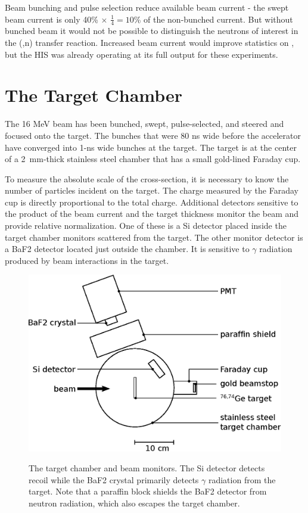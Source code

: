 Beam bunching and pulse selection reduce available beam current - the swept beam current is only 40\% $\times$ $\frac{1}{4} = 10$\% of the non-bunched current.  But without bunched beam it would not be possible to distinguish the neutrons of interest in the (,n) transfer reaction.  Increased beam current would improve statistics on \reaction, but the HIS was already operating at its full output for these experiments.

\section{The Target Chamber}

The 16 MeV  beam has been bunched, swept, pulse-selected, and steered and focused onto the target.  The bunches that were 80 ns wide before the accelerator have converged into 1-ns wide bunches at the target.  The target is at the center of a 2~mm-thick stainless steel chamber that has a small gold-lined Faraday cup.   

To measure the absolute scale of the cross-section, it is necessary to know the number of particles incident on the target.  The charge measured by the Faraday cup is directly proportional to the total charge.  Additional detectors sensitive to the product of the beam current and the target thickness monitor the beam and provide relative normalization.  One of these is a Si detector placed inside the target chamber monitors  scattered from the target.  The other monitor detector is a BaF2 detector located just outside the chamber.  It is sensitive to $\gamma$ radiation produced by beam interactions in the target.  
\begin{figure}[htp]
\centering
\includegraphics[width=1.0\textwidth]{figures/targetChamber.eps}
\label{fig:targetChamber}
\caption{The target chamber and beam monitors.  The Si detector detects recoil  while the BaF2 crystal primarily detects $\gamma$ radiation from the target.  Note that a paraffin block shields the BaF2 detector from neutron radiation, which also escapes the target chamber.}
\end{figure}


